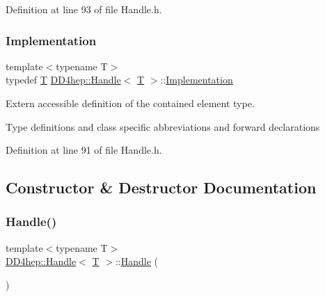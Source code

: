 Definition at line 93 of file Handle.\+h.

\hypertarget{class_d_d4hep_1_1_handle_ad7ff728a25806079516b8965b9113f1a}{}\label{class_d_d4hep_1_1_handle_ad7ff728a25806079516b8965b9113f1a} 
\subsubsection{\texorpdfstring{Implementation}{Implementation}}
{\footnotesize\ttfamily template$<$typename T$>$ \\
typedef \hyperlink{class_t}{T} \hyperlink{class_d_d4hep_1_1_handle}{D\+D4hep\+::\+Handle}$<$ \hyperlink{class_t}{T} $>$\+::\hyperlink{class_d_d4hep_1_1_handle_ad7ff728a25806079516b8965b9113f1a}{Implementation}}



Extern accessible definition of the contained element type. 

Type definitions and class specific abbreviations and forward declarations 

Definition at line 91 of file Handle.\+h.



\subsection{Constructor \& Destructor Documentation}
\hypertarget{class_d_d4hep_1_1_handle_a97b64b3f6c35305e77fe00bc2f73aeb7}{}\label{class_d_d4hep_1_1_handle_a97b64b3f6c35305e77fe00bc2f73aeb7} 
\subsubsection{\texorpdfstring{Handle()}{Handle()}\hspace{0.1cm}{\footnotesize\ttfamily [1/5]}}
{\footnotesize\ttfamily template$<$typename T$>$ \\
\hyperlink{class_d_d4hep_1_1_handle}{D\+D4hep\+::\+Handle}$<$ \hyperlink{class_t}{T} $>$\+::\hyperlink{class_d_d4hep_1_1_handle}{Handle} (\begin{DoxyParamCaption}{ }\end{DoxyParamCaption})\hspace{0.3cm}{\ttfamily [inline]}}



